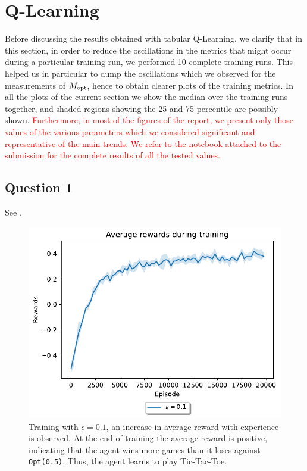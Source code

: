 \documentclass[10pt]{IEEEtran}
\begin{document}
\section{Q-Learning}
Before discussing the results obtained with tabular Q-Learning, we clarify that in this section, in order to reduce the oscillations in the metrics that might occur during a particular training run, we performed 10 complete training runs. This helped us in particular to dump the oscillations which we observed for the measurements of $M_{\text{opt}}$, hence to obtain clearer plots of the training metrics. In all the plots of the current section we show the median over the training runs together, and shaded regions showing the 25 and 75 percentile are possibly shown. \textcolor{red}{Furthermore, in most of the figures of the report, we present only those values of the various parameters which we considered significant and representative of the main trends. We refer to the notebook attached to the submission for the complete results of all the tested values.}

\subsection*{Question 1}
See .
\begin{figure}[h]
    \centering
    \includegraphics[width = 0.85\linewidth]{code/figures/rewards_epsilon_exploration_Q1.pdf}
    \caption{Training with $\epsilon = 0.1$, an increase in average reward with experience is observed. At the end of training the average reward is positive, indicating that the agent wins more games than it loses against \texttt{Opt(0.5)}. Thus, the agent learns to play Tic-Tac-Toe.}
    \label{plot_question1}
\end{figure}
\end{document}
